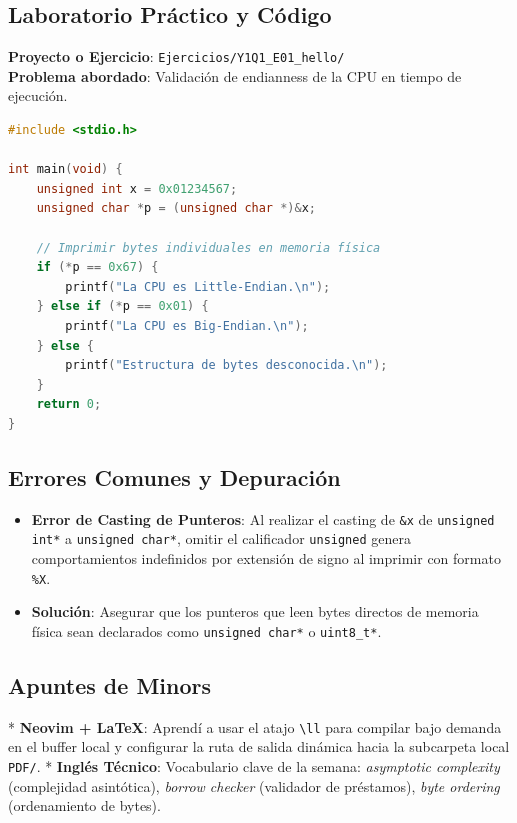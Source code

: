 \documentclass[11pt, a4paper]{article}
\begin{document}
\subsection{Laboratorio Práctico y Código}
\textbf{Proyecto o Ejercicio}: \texttt{Ejercicios/Y1Q1\_E01\_hello/} \\
\textbf{Problema abordado}: Validación de endianness de la CPU en tiempo de ejecución.

\begin{lstlisting}[language=C, caption={Verificación de Endianness en C}, label={code:endian}, path={Ejercicios/Y1Q1_E01_hello/endian.c}]
#include <stdio.h>

int main(void) {
    unsigned int x = 0x01234567;
    unsigned char *p = (unsigned char *)&x;
    
    // Imprimir bytes individuales en memoria física
    if (*p == 0x67) {
        printf("La CPU es Little-Endian.\n");
    } else if (*p == 0x01) {
        printf("La CPU es Big-Endian.\n");
    } else {
        printf("Estructura de bytes desconocida.\n");
    }
    return 0;
}
\end{lstlisting}

\subsection{Errores Comunes y Depuración}
\begin{itemize}
    \item \textbf{Error de Casting de Punteros}: Al realizar el casting de \texttt{\&x} de \texttt{unsigned int*} a \texttt{unsigned char*}, omitir el calificador \texttt{unsigned} genera comportamientos indefinidos por extensión de signo al imprimir con formato \texttt{\%X}.
    \item \textbf{Solución}: Asegurar que los punteros que leen bytes directos de memoria física sean declarados como \texttt{unsigned char*} o \texttt{uint8\_t*}.
\end{itemize}

\subsection{Apuntes de Minors}
*   \textbf{Neovim + \LaTeX}: Aprendí a usar el atajo \texttt{\textbackslash ll} para compilar bajo demanda en el buffer local y configurar la ruta de salida dinámica hacia la subcarpeta local \texttt{PDF/}.
*   \textbf{Inglés Técnico}: Vocabulario clave de la semana: \textit{asymptotic complexity} (complejidad asintótica), \textit{borrow checker} (validador de préstamos), \textit{byte ordering} (ordenamiento de bytes).
\end{document}
